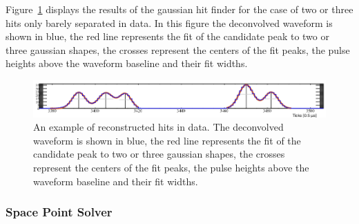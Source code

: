 Figure~\ref{pDUNE_sp_hits} displays the results of the gaussian hit finder for the case of two or three hits only barely separated in  data. In this figure the deconvolved waveform is shown in blue, the red line represents the fit of the candidate peak to two or three gaussian shapes, the crosses represent the centers of the fit peaks, the pulse heights above the waveform baseline and their fit widths. 
\begin{figure}[!h!tbp]
\centering
\includegraphics[width=\textwidth]{graphics/hits.png}
\caption[An example of reconstructed hits in  data]{An example of reconstructed hits in  data. The deconvolved waveform is shown in blue, the red line represents the fit of the candidate peak to two or three gaussian shapes, the crosses represent the centers of the fit peaks, the pulse heights above the waveform baseline and their fit widths.
}
\label{pDUNE_sp_hits}
\end{figure}

\subsubsection{Space Point Solver}

